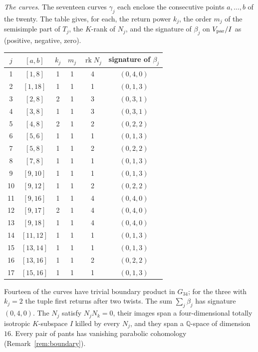 \documentclass[11pt]{amsart}
\theoremstyle{definition}
\theoremstyle{remark}
\newcommand{\Q}{\mathbb Q}
\newcommand{\rk}{\operatorname{rk}}
\newcommand{\Vp}{V_{\rm par}}
\begin{document}
\emph{The curves.} The seventeen curves $\gamma_j$ each enclose the consecutive points $a,\dots,b$ of the twenty. The table gives, for each, the return power $k_j$, the order $m_j$ of the semisimple part of $T_j$, the $K$-rank of $N_j$, and the signature of $\beta_j$ on $\Vp/I$ as (positive, negative, zero).
\begin{center}
\begin{tabular}{cccccc}
$j$ & $[a,b]$ & $k_j$ & $m_j$ & $\rk N_j$ & signature of $\beta_j$\\\hline
1 & $[1,8]$ & 1 & 1 & 4 & $(0,4,0)$\\
2 & $[1,18]$ & 1 & 1 & 1 & $(0,1,3)$\\
3 & $[2,8]$ & 2 & 1 & 3 & $(0,3,1)$\\
4 & $[3,8]$ & 1 & 1 & 3 & $(0,3,1)$\\
5 & $[4,8]$ & 2 & 1 & 2 & $(0,2,2)$\\
6 & $[5,6]$ & 1 & 1 & 1 & $(0,1,3)$\\
7 & $[5,8]$ & 1 & 1 & 2 & $(0,2,2)$\\
8 & $[7,8]$ & 1 & 1 & 1 & $(0,1,3)$\\
9 & $[9,10]$ & 1 & 1 & 1 & $(0,1,3)$\\
10 & $[9,12]$ & 1 & 1 & 2 & $(0,2,2)$\\
11 & $[9,16]$ & 1 & 1 & 4 & $(0,4,0)$\\
12 & $[9,17]$ & 2 & 1 & 4 & $(0,4,0)$\\
13 & $[9,18]$ & 1 & 1 & 4 & $(0,4,0)$\\
14 & $[11,12]$ & 1 & 1 & 1 & $(0,1,3)$\\
15 & $[13,14]$ & 1 & 1 & 1 & $(0,1,3)$\\
16 & $[13,16]$ & 1 & 1 & 2 & $(0,2,2)$\\
17 & $[15,16]$ & 1 & 1 & 1 & $(0,1,3)$
\end{tabular}
\end{center}
Fourteen of the curves have trivial boundary product in $G_{34}$; for the three with $k_j=2$ the tuple first returns after two twists. The sum $\sum_j\beta_j$ has signature $(0,4,0)$. The $N_j$ satisfy $N_jN_k=0$, their images span a four-dimensional totally isotropic $K$-subspace $I$ killed by every $N_j$, and they span a $\Q$-space of dimension $16$. Every pair of pants has vanishing parabolic cohomology (Remark~\ref{rem:boundary}).
\end{document}
